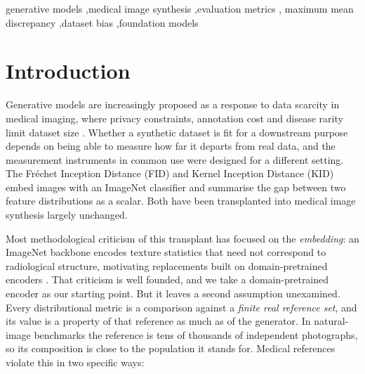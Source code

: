 \documentclass[preprint,12pt,authoryear]{elsarticle}
\newcommand{\Lb}[1]{\ensuremath{\mathrm{L}#1}}
\begin{document}
\begin{frontmatter}
\begin{abstract}
monotonicity fails at \Lb{1}--\Lb{2}; and $k$-nearest-neighbour precision/recall
coverage fails its own mode-drop validation at \emph{every} depth, with recall
rising rather than falling as diversity is removed. For per-image novelty
scoring, the choice of scoring rule matters more than depth: a shrinkage
Mahalanobis distance reaches AUC $0.972$ where distance to the real centroid
reaches $0.846$. We release the evaluation code and report a concrete protocol:
report the number of distinct subjects behind every reference set, calibrate
against a cohort null, audit read-out depth rather than defaulting to the final block, and do not
report $k$-NN coverage in this feature space without validating it.
\end{abstract}

\begin{keyword}
generative models \sep medical image synthesis \sep evaluation metrics \sep
maximum mean discrepancy \sep dataset bias \sep foundation models
\end{keyword}

\end{frontmatter}

\section{Introduction}
\label{sec:intro}

Generative models are increasingly proposed as a response to data scarcity in
medical imaging, where privacy constraints, annotation cost and disease rarity
limit dataset size \citep{kebaili2023deep, kazerouni2023diffusion}. Whether a
synthetic dataset is fit for a downstream purpose depends on being able to
measure how far it departs from real data, and the measurement instruments in
common use were designed for a different setting. The Fr\'echet Inception
Distance (FID) \citep{heusel2017gans} and Kernel Inception Distance (KID)
\citep{binkowski2018demystifying} embed images with an ImageNet classifier and
summarise the gap between two feature distributions as a scalar. Both have been
transplanted into medical image synthesis largely unchanged.

Most methodological criticism of this transplant has focused on the
\emph{embedding}: an ImageNet backbone encodes texture statistics that need not
correspond to radiological structure, motivating replacements built on
domain-pretrained encoders \citep{dohmen2025similarity, woodland2024feature}.
That criticism is well founded, and we take a domain-pretrained encoder as our
starting point. But it leaves a second assumption unexamined. Every
distributional metric is a comparison against a \emph{finite real reference
set}, and its value is a property of that reference as much as of the generator.
In natural-image benchmarks the reference is tens of thousands of independent
photographs, so its composition is close to the population it stands for.
Medical references violate this in two specific ways:
\end{document}
